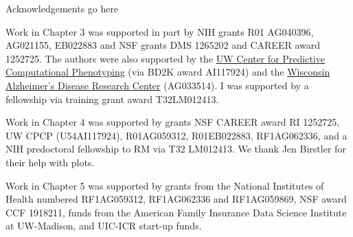 \begin{acks}
Acknowledgements go here 

Work in Chapter 3 was supported in part by NIH grants R01 AG040396, AG021155, EB022883 
and NSF grants DMS 1265202 and CAREER award 1252725.
The authors were also supported by the \href{http://cpcp.wisc.edu/}{UW Center for Predictive Computational Phenotyping} (via BD2K award AI117924) and the \href{http://www.adrc.wisc.edu/}{Wisconsin Alzheimer's Disease Research Center} (AG033514). 
I was supported by a fellowship via training grant award T32LM012413.

Work in Chapter 4 was supported by grants NSF CAREER award RI 1252725, UW CPCP (U54AI117924), R01AG059312, R01EB022883, RF1AG062336, 
and a NIH predoctoral fellowship to RM via T32 LM012413. We thank Jen Birstler for their help with plots.

Work in Chapter 5 was supported by grants from the National Institutes of Health numbered RF1AG059312, RF1AG062336 and RF1AG059869, NSF award CCF 1918211, funds from the American Family Insurance Data Science Institute at UW-Madison, and UIC-ICR start-up funds.

\end{acks}
